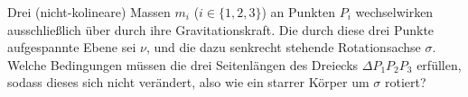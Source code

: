 \begin{minipage}[b]{0.7\textwidth}

\begin{Exercise}[label  = rotierendes 3-Körper-Problem, difficulty = 3, label = cmrot, origin = {XX. IPhO 1989}, title = Starrer Körper]
	Drei (nicht-kolineare) Massen $m_i$ ($i \in \{1,2,3\}$) an Punkten $P_i$ wechselwirken ausschließlich über durch ihre Gravitationskraft. Die durch diese drei Punkte aufgespannte Ebene sei $\nu$, und die dazu senkrecht stehende Rotationsachse $\sigma$. Welche Bedingungen müssen die drei Seitenlängen des Dreiecks $\Delta P_1P_2P_3$ erfüllen, sodass dieses sich nicht verändert, also wie ein starrer Körper um $\sigma$ rotiert?
\end{Exercise}
\end{minipage}
\begin{minipage}[b]{0.3\textwidth}
	\centering
{}
\end{minipage}